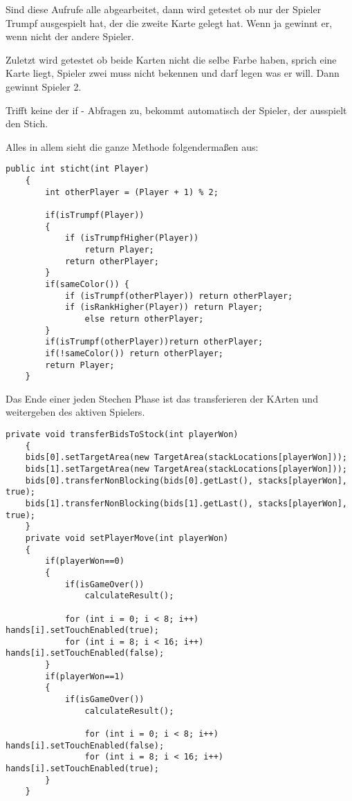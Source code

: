Sind diese Aufrufe alle abgearbeitet, dann wird getestet ob nur der Spieler Trumpf ausgespielt hat, der die zweite Karte gelegt hat. Wenn ja gewinnt er, wenn nicht der andere Spieler.

Zuletzt wird getestet ob beide Karten nicht die selbe Farbe haben, sprich eine Karte liegt, Spieler zwei muss nicht bekennen und darf legen was er will. Dann gewinnt Spieler 2.

Trifft keine der if - Abfragen zu, bekommt automatisch der Spieler, der ausspielt den Stich.

Alles in allem sieht die ganze Methode folgendermaßen aus:

\begin{lstlisting}[caption={sticht() Methode},captionpos=b]
    public int sticht(int Player)
    {
        int otherPlayer = (Player + 1) % 2;

        if(isTrumpf(Player))
        {
            if (isTrumpfHigher(Player))
                return Player;
            return otherPlayer;
        }
        if(sameColor()) {
            if (isTrumpf(otherPlayer)) return otherPlayer;
            if (isRankHigher(Player)) return Player;
                else return otherPlayer;
        }
        if(isTrumpf(otherPlayer))return otherPlayer;
        if(!sameColor()) return otherPlayer;
        return Player;
    }
\end{lstlisting}

Das Ende einer jeden Stechen Phase ist das transferieren der KArten und weitergeben des aktiven Spielers.


\begin{lstlisting}[caption={TransferBidsToStock und setPlayerMove},captionpos=b]
    private void transferBidsToStock(int playerWon)
    {
    bids[0].setTargetArea(new TargetArea(stackLocations[playerWon]));
    bids[1].setTargetArea(new TargetArea(stackLocations[playerWon]));
    bids[0].transferNonBlocking(bids[0].getLast(), stacks[playerWon], true);
    bids[1].transferNonBlocking(bids[1].getLast(), stacks[playerWon], true);
    }
    private void setPlayerMove(int playerWon)
    {
        if(playerWon==0)
        {
            if(isGameOver())
                calculateResult();

            for (int i = 0; i < 8; i++) hands[i].setTouchEnabled(true);
            for (int i = 8; i < 16; i++) hands[i].setTouchEnabled(false);
        }
        if(playerWon==1)
        {
            if(isGameOver())
                calculateResult();

                for (int i = 0; i < 8; i++) hands[i].setTouchEnabled(false);
                for (int i = 8; i < 16; i++) hands[i].setTouchEnabled(true);
        }
    }
\end{lstlisting}


